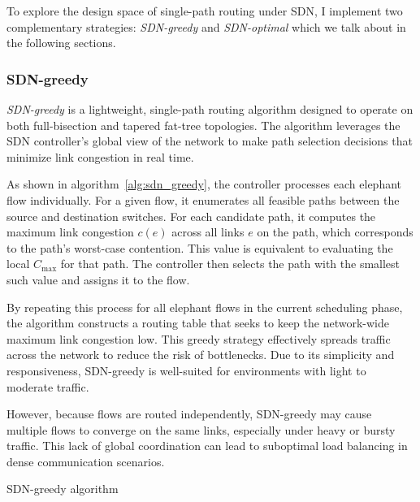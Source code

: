 To explore the design space of single-path routing under SDN, I implement two complementary strategies: \textit{SDN-greedy} and \textit{SDN-optimal} which we talk about in the following sections.

\subsubsection{SDN-greedy}

\textit{SDN-greedy} is a lightweight, single-path routing algorithm designed to operate on both full-bisection and tapered fat-tree topologies. The algorithm leverages the SDN controller’s global view of the network to make path selection decisions that minimize link congestion in real time.

As shown in algorithm~\ref{alg:sdn_greedy}, the controller processes each elephant flow individually. For a given flow, it enumerates all feasible paths between the source and destination switches. For each candidate path, it computes the maximum link congestion \( c(e) \) across all links \( e \) on the path, which corresponds to the path's worst-case contention. This value is equivalent to evaluating the local \( C_{\text{max}} \) for that path. The controller then selects the path with the smallest such value and assigns it to the flow.

By repeating this process for all elephant flows in the current scheduling phase, the algorithm constructs a routing table that seeks to keep the network-wide maximum link congestion low. This greedy strategy effectively spreads traffic across the network to reduce the risk of bottlenecks. Due to its simplicity and responsiveness, SDN-greedy is well-suited for environments with light to moderate traffic.

However, because flows are routed independently, SDN-greedy may cause multiple flows to converge on the same links, especially under heavy or bursty traffic. This lack of global coordination can lead to suboptimal load balancing in dense communication scenarios.

\begin{algorithm}[H]
\DontPrintSemicolon
\caption{SDN-greedy algorithm}
\label{alg:sdn_greedy}
\end{algorithm}



